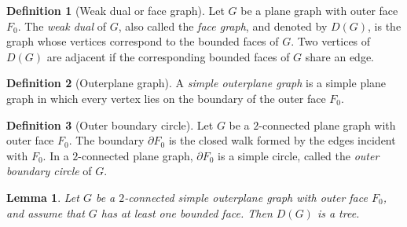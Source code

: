 \documentclass[12pt]{amsart}
\theoremstyle{theorem}%
\newtheorem{lemma}[theorem]{Lemma}
\theoremstyle{definition}%
\newtheorem{definition}{Definition}
\begin{document}
\begin{definition}[Weak dual or face graph]
Let $G$ be a plane graph with outer face $F_0$.
The \emph{weak dual} of $G$, also called the \emph{face graph}, and denoted by $D(G)$,
is the graph whose vertices correspond to the bounded faces of $G$.
Two vertices of $D(G)$ are adjacent if the corresponding bounded faces of $G$
share an edge.
\end{definition}


\begin{definition}[Outerplane graph]
A \emph{simple outerplane graph} is a simple plane graph in which every vertex lies on the boundary of the outer face $F_0$.

\end{definition}

\begin{definition}[Outer boundary circle]
Let $G$ be a $2$-connected plane graph with outer face $F_0$.
The boundary $\partial F_0$ is the closed walk formed by the edges incident with $F_0$.
In a $2$-connected plane graph, $\partial F_0$ is a simple circle, called the
\emph{outer boundary circle} of $G$.
\end{definition}



\begin{lemma}\label{lemmatree}
Let $G$ be a $2$-connected simple outerplane graph with outer face $F_0$, and assume that $G$ has at least one
bounded face. Then $D(G)$ is a tree.
\end{lemma}
\end{document}
